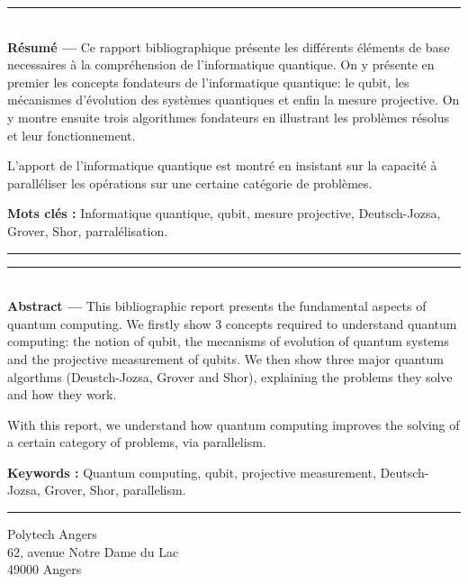 \documentclass[12pt,a4paper]{report}
\begin{document}
\vspace*{\fill}
\noindent\rule[2pt]{\textwidth}{0.5pt}\\
{\textbf{Résumé ---}}
Ce rapport bibliographique présente les différents éléments de base necessaires à la compréhension de l'informatique quantique. On y présente en premier les concepts fondateurs de l'informatique quantique: le qubit, les mécanismes d'évolution des systèmes quantiques et enfin la mesure projective. On y montre ensuite trois algorithmes fondateurs en illustrant les problèmes résolus et leur fonctionnement.

L'apport de l'informatique quantique est montré en insistant sur la capacité à paralléliser les opérations sur une certaine catégorie de problèmes.

{\textbf{Mots clés :}}
Informatique quantique, qubit, mesure projective, Deutsch-Jozsa, Grover, Shor, parralélisation.
\\
\noindent\rule[2pt]{\textwidth}{0.5pt}


\vspace*{\fill}
\noindent\rule[2pt]{\textwidth}{0.5pt}\\
{\textbf{Abstract ---}}
This bibliographic report presents the fundamental aspects of quantum computing. We firstly show 3 concepts required to understand quantum computing: the notion of qubit, the mecanisms of evolution of quantum systems and the projective measurement of qubits. We then show three major quantum algorthms (Deustch-Jozsa, Grover and Shor), explaining the problems they solve and how they work.

With this report, we understand how quantum computing improves the solving of a certain category of problems, via parallelism. 

{\textbf{Keywords :}}
Quantum computing, qubit, projective measurement, Deutsch-Jozsa, Grover, Shor, parallelism.
\\
\noindent\rule[2pt]{\textwidth}{0.5pt}

\begin{center}
  Polytech Angers\\
  62, avenue Notre Dame du Lac\\
  49000 Angers
\end{center}
\vspace*{\fill}
\end{document}

